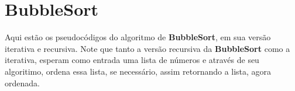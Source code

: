 \section{BubbleSort}
Aqui estão os pseudocódigos do algoritmo de \textbf{BubbleSort}, em sua versão iterativa e recursiva. Note que tanto a versão recursiva da \textbf{BubbleSort} como a iterativa, esperam como entrada uma lista de números e através de seu algoritimo, ordena essa lista, se necessário, assim retornando a lista, agora ordenada.  
 
 

 

